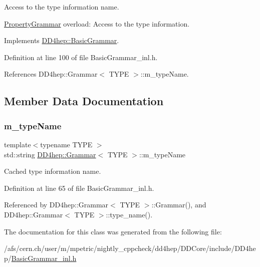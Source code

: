 Access to the type information name. 

\hyperlink{class_d_d4hep_1_1_property_grammar}{Property\+Grammar} overload\+: Access to the type information. 

Implements \hyperlink{class_d_d4hep_1_1_basic_grammar_acae3770beb2e60eaf76c7d85722c8bc2}{D\+D4hep\+::\+Basic\+Grammar}.



Definition at line 100 of file Basic\+Grammar\+\_\+inl.\+h.



References D\+D4hep\+::\+Grammar$<$ T\+Y\+P\+E $>$\+::m\+\_\+type\+Name.



\subsection{Member Data Documentation}
\hypertarget{class_d_d4hep_1_1_grammar_a10842e3b2f4549f2f8f2b0306e17a43d}{}\label{class_d_d4hep_1_1_grammar_a10842e3b2f4549f2f8f2b0306e17a43d} 
\subsubsection{\texorpdfstring{m\+\_\+type\+Name}{m\_typeName}}
{\footnotesize\ttfamily template$<$typename T\+Y\+PE $>$ \\
std\+::string \hyperlink{class_d_d4hep_1_1_grammar}{D\+D4hep\+::\+Grammar}$<$ T\+Y\+PE $>$\+::m\+\_\+type\+Name\hspace{0.3cm}{\ttfamily [private]}}



Cached type information name. 



Definition at line 65 of file Basic\+Grammar\+\_\+inl.\+h.



Referenced by D\+D4hep\+::\+Grammar$<$ T\+Y\+P\+E $>$\+::\+Grammar(), and D\+D4hep\+::\+Grammar$<$ T\+Y\+P\+E $>$\+::type\+\_\+name().



The documentation for this class was generated from the following file\+:\begin{DoxyCompactItemize}
\item 
/afs/cern.\+ch/user/m/mpetric/nightly\+\_\+cppcheck/dd4hep/\+D\+D\+Core/include/\+D\+D4hep/\hyperlink{_basic_grammar__inl_8h}{Basic\+Grammar\+\_\+inl.\+h}\end{DoxyCompactItemize}
